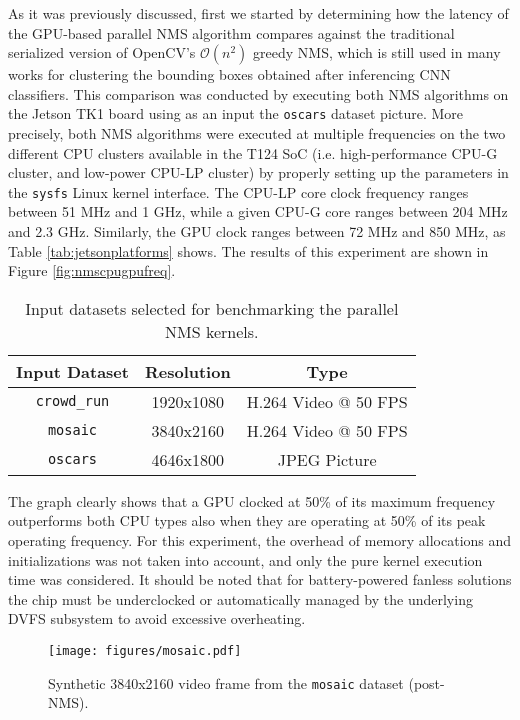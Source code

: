 As it was previously discussed, first we started by determining how the latency of the GPU-based parallel NMS algorithm compares 
against the traditional serialized version of OpenCV's $\mathcal{O}(n^{2})$ greedy NMS, which is still used in many 
works \cite{huval2015empirical} for clustering the bounding boxes obtained after inferencing CNN classifiers. This comparison 
was conducted by executing both NMS algorithms on the Jetson TK1 board using as an input the \texttt{oscars} dataset picture. 
More precisely, both NMS algorithms were executed at multiple frequencies on the two different CPU clusters available in the T124 SoC 
(i.e. high-performance CPU-G cluster, and low-power CPU-LP cluster) by properly setting up the parameters in the \texttt{sysfs} Linux kernel interface. 
The CPU-LP core clock frequency ranges between 51 MHz and 1 GHz, while a given CPU-G core ranges between 204 MHz and 2.3 GHz. Similarly, 
the GPU clock ranges between 72 MHz and 850 MHz, as Table \ref{tab:jetsonplatforms} shows. The results of this experiment are shown in 
Figure \ref{fig:nmscpugpufreq}.

\begin{table}
  \renewcommand{\arraystretch}{1.3}
  \caption{Input datasets selected for benchmarking the parallel NMS kernels.}
  \centering
  \footnotesize
  \begin{tabular}{| c | c | c |}
  \hline
  \textbf{Input Dataset} & \textbf{Resolution} & \textbf{Type}  \\
  \hline
   \texttt{crowd\_run} & 1920x1080 & H.264 Video @ 50 FPS \\
   \texttt{mosaic} & 3840x2160 & H.264 Video @ 50 FPS \\
   \texttt{oscars} & 4646x1800 & JPEG Picture \\
  \hline
  \end{tabular}
  \normalsize
  \label{tab:nmsinputdatasets}
 \end{table}

The graph clearly shows that a GPU clocked at 50\% of its maximum frequency outperforms both CPU types 
also when they are operating at 50\% of its peak operating frequency. For this experiment, the overhead of memory allocations 
and initializations was not taken into account, and only the pure kernel execution time was considered. It should be noted 
that for battery-powered fanless solutions the chip must be underclocked or automatically managed by the underlying DVFS 
subsystem to avoid excessive overheating. 

\begin{figure}[t]
  \centering
  \texttt{[image: figures/mosaic.pdf]}
  \caption{\label{fig:nmsmosaic} Synthetic 3840x2160 video frame from the \texttt{mosaic} dataset (post-NMS).}
\end{figure}

